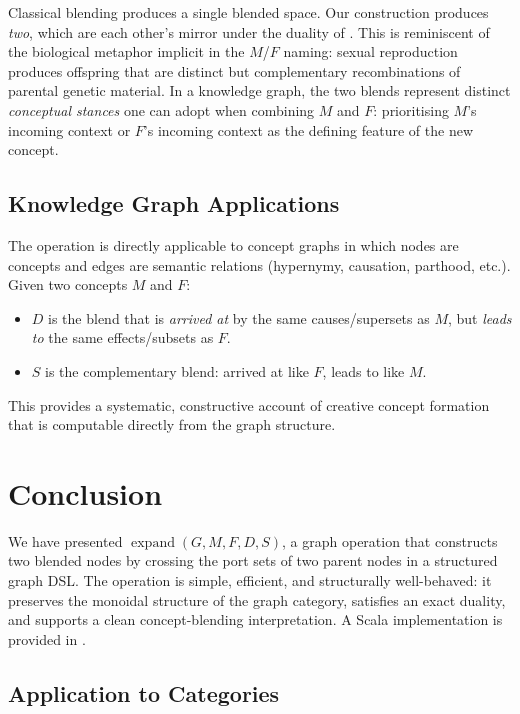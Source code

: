 \documentclass[11pt, a4paper]{article}
\theoremstyle{definition}
\theoremstyle{plain}
\theoremstyle{remark}
\newcommand{\expand}{\operatorname{expand}}
\begin{document}
Classical blending produces a single blended space.  Our construction produces
\emph{two}, which are each other's mirror under the duality of
.  This is reminiscent of the biological metaphor implicit
in the $M$/$F$ naming: sexual reproduction produces offspring that are distinct
but complementary recombinations of parental genetic material.  In a knowledge
graph, the two blends represent distinct \emph{conceptual stances} one can
adopt when combining $M$ and $F$: prioritising $M$'s incoming context or $F$'s
incoming context as the defining feature of the new concept.

\subsection{Knowledge Graph Applications}

The operation is directly applicable to concept graphs in which nodes are
concepts and edges are semantic relations (hypernymy, causation, parthood,
etc.).  Given two concepts $M$ and $F$:
\begin{itemize}[leftmargin=2em]
  \item $D$ is the blend that is \emph{arrived at} by the same causes/supersets
    as $M$, but \emph{leads to} the same effects/subsets as $F$.
  \item $S$ is the complementary blend: arrived at like $F$, leads to like $M$.
\end{itemize}
This provides a systematic, constructive account of creative concept formation
that is computable directly from the graph structure.

\section{Conclusion}
\label{sec:conclusion}

We have presented $\expand(G, M, F, D, S)$, a graph operation that constructs
two blended nodes by crossing the port sets of two parent nodes in a structured
graph DSL.  The operation is simple, efficient, and structurally well-behaved:
it preserves the monoidal structure of the graph category, satisfies an exact
duality, and supports a clean concept-blending interpretation.  A Scala
implementation is provided in .

\subsection*{Application to Categories}
\end{document}
